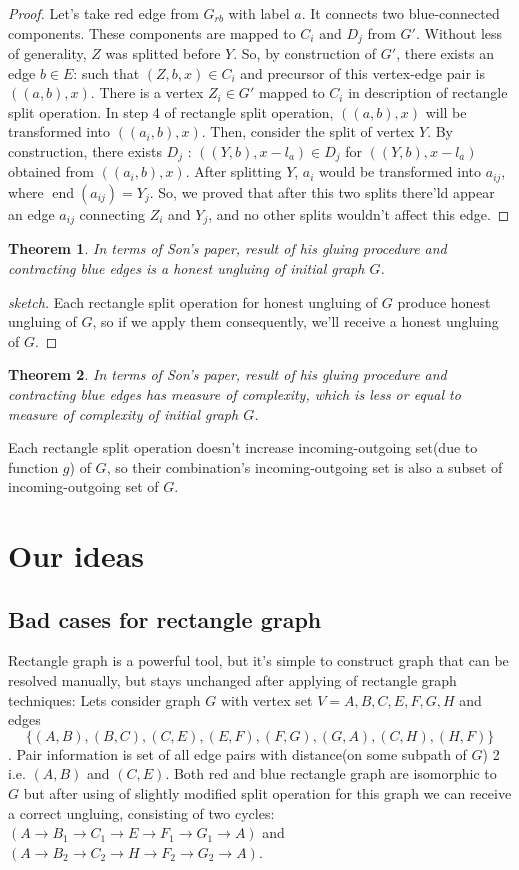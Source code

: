 \documentclass[12pt,a4paper,oneside]{article}
\newtheorem{theorem}{Theorem}
\begin{document}
\begin{proof}
Let's take red edge from $G_{rb}$ with label $a$. It connects two blue-connected components. These components are mapped to $C_i$ and $D_j$ from $G'$. Without less of generality, $Z$ was splitted before $Y$. So, by construction of $G'$, there exists an edge $b \in E$: such that $(Z, b, x)\in C_i$ and precursor of this vertex-edge pair is $((a,b),x)$. There is a vertex $Z_i \in G'$ mapped to $C_i$ in description of rectangle split operation. In step 4 of rectangle split operation, $((a, b), x)$ will be transformed into $((a_i,b),x)$. Then, consider the split of vertex $Y$. By construction, there exists $D_j$ :  $((Y,b),x-l_a) \in D_j$ for $((Y,b),x-l_a)$ obtained from $((a_i,b),x)$. After splitting $Y$, $a_i$ would be transformed into $a_{ij}$, where $\mathop{end}(a_{ij}) = Y_j$. So, we proved that after this two splits there'ld appear an edge $a_{ij}$ connecting $Z_i$ and $Y_j$, and no other splits wouldn't affect this edge.   
\end{proof}


\begin{theorem}
  In terms of Son's paper, result of his gluing procedure and contracting blue edges is a honest ungluing of initial graph $G$. 
\end{theorem}
\begin{proof}[sketch]
Each rectangle split operation for honest ungluing of $G$ produce honest ungluing of $G$, so if we apply them consequently, we'll receive a honest ungluing of $G$.
\end{proof}
\begin{theorem}
  In terms of Son's paper, result of his gluing procedure and contracting blue edges has measure of complexity, which is less or equal to measure of complexity of initial graph $G$. 
\end{theorem}
Each rectangle split operation  doesn't increase incoming-outgoing set(due to function $g$) of $G$, so their combination's incoming-outgoing set is also a subset of incoming-outgoing set of $G$.


\section{Our ideas}

\subsection{Bad cases for rectangle graph}
Rectangle graph is a powerful tool, but it's simple to construct graph that can be resolved manually, but stays unchanged after applying of rectangle graph techniques:
Lets consider graph $G$ with vertex set $V = {A,B,C,E,F,G,H}$ and edges $$\{(A,B),(B,C),(C,E),(E,F),(F,G),(G,A),(C,H),(H,F)\}$$. Pair information is set of all edge pairs with distance(on some subpath of $G$) 2 i.e. $(A,B)$ and $(C,E)$.
Both red and blue rectangle graph are isomorphic to $G$ but after using of slightly modified split operation for this graph we can receive a correct ungluing, consisting of two cycles: $(A\rightarrow B_1\rightarrow C_1\rightarrow E\rightarrow F_1\rightarrow G_1\rightarrow A)$ and $(A\rightarrow B_2\rightarrow C_2\rightarrow H\rightarrow F_2\rightarrow G_2\rightarrow A)$.
\end{document}
